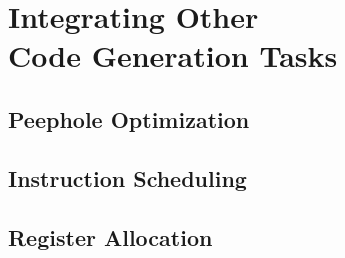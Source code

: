 %

\chapter[Integrating Other Code Generation Tasks]
        {Integrating Other\\ Code Generation Tasks}

\section{Peephole Optimization}
\section{Instruction Scheduling}
\section{Register Allocation}
